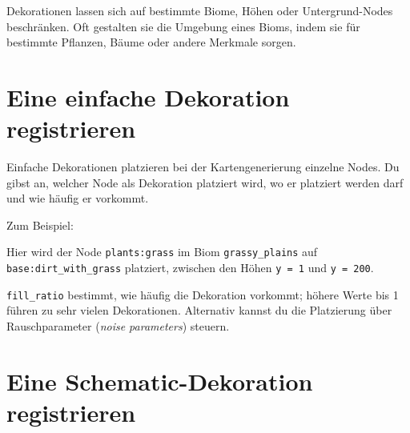 Dekorationen lassen sich auf bestimmte Biome, Höhen oder
Untergrund-Nodes beschränken. Oft gestalten sie die Umgebung eines
Bioms, indem sie für bestimmte Pflanzen, Bäume oder andere Merkmale
sorgen.

\section{Eine einfache Dekoration
registrieren}\label{eine-einfache-dekoration-registrieren}

Einfache Dekorationen platzieren bei der Kartengenerierung einzelne
Nodes. Du gibst an, welcher Node als Dekoration platziert wird, wo er
platziert werden darf und wie häufig er vorkommt.

Zum Beispiel:

\begin{Shaded}
\begin{Highlighting}[]
\OperatorTok{(\{}
     \OperatorTok{=} \OperatorTok{,}
     \OperatorTok{=} \OperatorTok{\{}  \OperatorTok{\},}
     \OperatorTok{=} \OperatorTok{,}
     \OperatorTok{=} \OperatorTok{,}
     \OperatorTok{=} \OperatorTok{\{}  \OperatorTok{\},}
     \OperatorTok{=} \OperatorTok{,}
     \OperatorTok{=} \OperatorTok{,}
     \OperatorTok{=} \OperatorTok{,}
\OperatorTok{\})}
\end{Highlighting}
\end{Shaded}

Hier wird der Node \texttt{plants:grass} im Biom
\texttt{grassy\_\allowbreak{}plains} auf
\texttt{base:dirt\_\allowbreak{}with\_\allowbreak{}grass} platziert,
zwischen den Höhen \texttt{y = 1} und \texttt{y = 200}.

\texttt{fill\_\allowbreak{}ratio} bestimmt, wie häufig die Dekoration
vorkommt; höhere Werte bis 1 führen zu sehr vielen Dekorationen.
Alternativ kannst du die Platzierung über Rauschparameter (\emph{noise
parameters}) steuern.

\section{Eine Schematic-Dekoration
registrieren}\label{eine-schematic-dekoration-registrieren}

